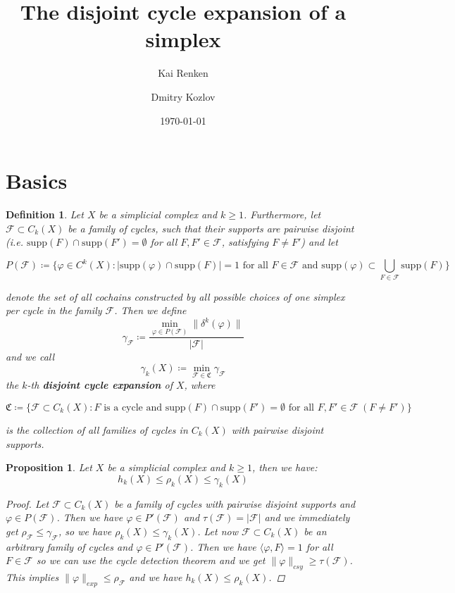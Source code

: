\documentclass{article}
\title{The disjoint cycle expansion of a simplex}
\author{Kai Renken \and Dmitry Kozlov}
\date{\today}
\newcommand{\supp}{\mathrm{supp}}
\newtheorem{defi}{Definition}[section]
\newtheorem{prop}{Proposition}[section]
\begin{document}
\maketitle


\begin{abstract}

\end{abstract}

\section{Basics}

\begin{defi}
Let \(X\) be a simplicial complex and \(k\geq 1\). Furthermore, let \(\mathcal{F}\subset C_k(X)\) be a family of cycles, such that their supports are pairwise disjoint (i.e. \(\supp(F)\cap\supp(F')=\emptyset\) for all \(F,F'\in\mathcal{F}\), satisfying \(F\neq F'\)) and let
\begin{small}
\[
P(\mathcal{F})\coloneqq\{\varphi\in C^k(X):|\supp(\varphi)\cap\supp(F)|=1\text{ for all }F\in\mathcal{F}\text{ and }\supp(\varphi)\subset\bigcup\limits_{F\in\mathcal{F}}\supp(F)\}
\]
\end{small}
denote the set of all cochains constructed by all possible choices of one simplex per cycle in the family \(\mathcal{F}\). Then we define
\[
\gamma_{\mathcal{F}}\coloneqq\frac{\min\limits_{\varphi\in P(\mathcal{F})}\|\delta^k(\varphi)\|}{|\mathcal{F}|}
\]
and we call
\[
\gamma_k(X)\coloneqq\min\limits_{\mathcal{F}\in\mathfrak{C}}\gamma_{\mathcal{F}}
\]
the \(k\)-th \textbf{disjoint cycle expansion} of \(X\), where
\begin{small}
\[
\mathfrak{C}\coloneqq\{\mathcal{F}\subset C_k(X):F\text{ is a cycle and }\supp(F)\cap\supp(F')=\emptyset\text{ for all }F,F'\in\mathcal{F}\:(F\neq F')\}
\]
\end{small}
is the collection of all families of cycles in \(C_k(X)\) with pairwise disjoint supports.
\end{defi}

\begin{prop}\label{proposition1}
Let \(X\) be a simplicial complex and \(k\geq 1\), then we have:
\[
h_k(X)\leq\rho_k(X)\leq\gamma_k(X)
\]
\begin{proof}
Let \(\mathcal{F}\subset C_k(X)\) be a family of cycles with pairwise disjoint supports and \(\varphi\in P(\mathcal{F})\). Then we have \(\varphi\in P'(\mathcal{F})\) and \(\tau(\mathcal{F})=|\mathcal{F}|\) and we immediately get \(\rho_{\mathcal{F}}\leq\gamma_{\mathcal{F}}\), so we have \(\rho_k(X)\leq\gamma_k(X)\). Let now \(\mathcal{F}\subset C_k(X)\) be an arbitrary family of cycles and \(\varphi\in P'(\mathcal{F})\). Then we have \(\langle\varphi,F\rangle=1\) for all \(F\in\mathcal{F}\) so we can use the cycle detection theorem and we get \(\|\varphi\|_{csy}\geq\tau(\mathcal{F})\). This implies \(\|\varphi\|_{exp}\leq\rho_{\mathcal{F}}\) and we have \(h_k(X)\leq\rho_k(X)\).
\end{proof}
\end{prop}
\end{document}
